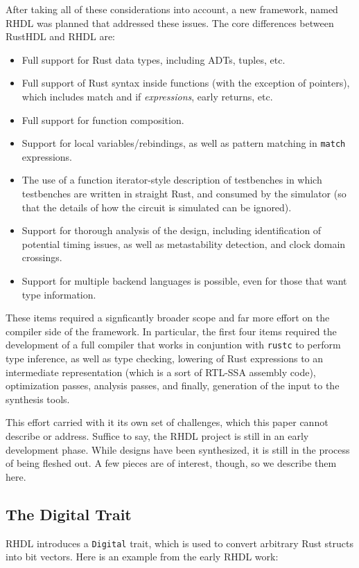 \documentclass[conference]{IEEEtran}
\begin{document}
After taking all of these considerations into account, a new framework, named RHDL was planned that addressed these issues.  The 
core differences between RustHDL and RHDL are:

\begin{itemize}
  \item Full support for Rust data types, including ADTs, tuples, etc.
  \item Full support of Rust syntax inside functions (with the exception of pointers), which includes 
  match and if \emph{expressions}, early returns, etc.
  \item Full support for function composition.
  \item Support for local variables/rebindings, as well as pattern matching in \verb|match| expressions.
  \item The use of a function iterator-style description of testbenches in which testbenches are written in 
  straight Rust, and consumed by the simulator (so that the details of how the circuit is simulated can be ignored).
  \item Support for thorough analysis of the design, including identification of potential timing issues, as well as
  metastability detection, and clock domain crossings.
  \item Support for multiple backend languages is possible, even for those that want type information.
\end{itemize}

These items required a signficantly broader scope and far more effort on the compiler side of the framework.  In particular,
the first four items required the development of a full compiler that works in conjuntion with \verb|rustc| to perform
type inference, as well as type checking, lowering of Rust expressions to an intermediate representation (which is a sort of
RTL-SSA assembly code), optimization passes, analysis passes, and finally, generation of the input to the synthesis tools.

This effort carried with it its own set of challenges, which this paper cannot describe or address.  Suffice to say, the RHDL
project is still in an early development phase.  While designs have been synthesized, it is still in the process of being
fleshed out.  A few pieces are of interest, though, so we describe them here.

\subsection{The Digital Trait}
RHDL introduces a \verb|Digital| trait, which is used to convert arbitrary Rust structs into bit vectors.  Here is an example from
the early RHDL work:
\end{document}
